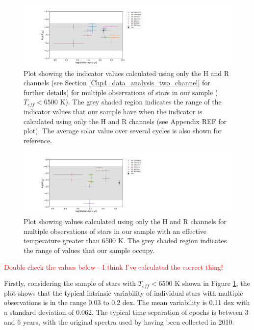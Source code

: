 \begin{figure}
    \centering
    \includegraphics[scale=0.55]{Figures/4-Chromospheric_age/cool_multiple_obs_plot_with_sun.pdf}
    \caption{Plot showing the \Rprime indicator values calculated using only the H and R channels (see Section \ref{Chp4_data_analysis_two_channel} for further details) for multiple observations of stars in our sample ($T_{eff} < 6500$ K). The grey shaded region indicates the range of the \Rprime indicator values that our sample have when the \Rprime indicator is calculated using only the H and R channels (see Appendix REF for plot). The average solar value over several cycles \citep{Egeland_etal_2017} is also shown for reference.}
    \label{fig:ca_multiple_obs}
\end{figure}

\begin{figure}
    \centering
    \includegraphics[scale=0.55]{Figures/4-Chromospheric_age/hot_multiple_obs_plot_with_sun.pdf}
    \caption{Plot showing \Rprime values calculated using only the H and R channels for multiple observations of stars in our sample with an effective temperature greater than 6500 K. The grey shaded region indicates the range of \Rprime values that our sample occupy.}
    \label{fig:ca_multiple_obs_hot_Fstars}
\end{figure}

\textcolor{red}{Double check the values below - I think I've calculated the correct thing!}

Firstly, considering the sample of stars with $T_{eff} < 6500$ K shown in Figure \ref{fig:ca_multiple_obs}, the plot shows that the typical intrinsic variability of individual stars with multiple observations is in the range 0.03 to 0.2 dex. The mean variability is 0.11 dex with a standard deviation of 0.062. The typical time separation of epochs is between 3 and 6 years, with the original spectra used by \citet{Bruntt_etal_2012} having been collected in 2010.

